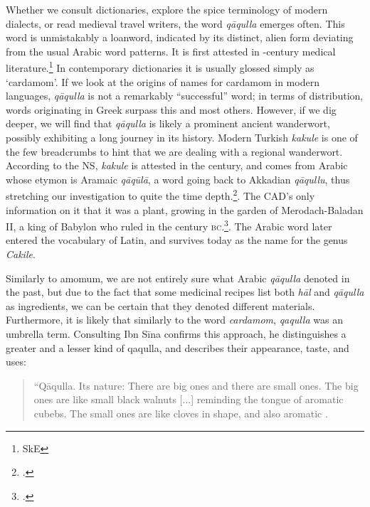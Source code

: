 

Whether we consult dictionaries, explore the spice terminology of modern dialects, or read medieval travel writers, the word  \textit{qāqulla} emerges often. This word is unmistakably a loanword, indicated by its distinct, alien form deviating from the usual Arabic word patterns. It is first attested in -century medical literature.\footnote{SkE} In contemporary dictionaries it is usually glossed simply as `cardamom'. If we look at the origins of names for cardamom in modern languages, \textit{qāqulla} is not a remarkably ``successful'' word; in terms of distribution, words originating in Greek surpass this and most others. However, if we dig deeper, we will find that \textit{qāqulla} is likely a prominent ancient \gls{wanderwort}, possibly exhibiting a long journey in its history. Modern Turkish \textit{kakule} is one of the few breadcrumbs to hint that we are dealing with a regional \gls{wanderwort}. According to the \gls{NS}, \textit{kakule} is attested in the  century, and comes from Arabic whose etymon is Aramaic \textit{qāqūlā}, a word going back to Akkadian \textit{qāqullu}, thus stretching our investigation to quite the time depth.\footcite[kakule ]{ns}. The \gls{CAD}'s only information on it that it was a plant, growing in the garden of Merodach-Baladan II, a king of Babylon who ruled in the  century \textsc{bc}.\footcite[Vol. 13, p. 124]{roth_assyrian_2004}. The Arabic word later entered the vocabulary of Latin, and survives today as the name for the genus \textit{Cakile}.

Similarly to amomum, we are not entirely sure what Arabic \textit{qāqulla} denoted in the past, but due to the fact that some medicinal recipes list both \textit{hāl} and \textit{qāqulla} as ingredients, we can be certain that they denoted different materials. Furthermore, it is likely that similarly to the word \textit{cardamom}, \textit{qaqulla} was an umbrella term. Consulting Ibn S\={i}na confirms this approach, he distinguishes a greater and a lesser kind of qaqulla, and describes their appearance, taste, and uses:

\begin{quote}
{\small``Q\={a}qulla. Its nature: There are big ones and there are small ones. The big ones are like small black walnuts [...] reminding the tongue of aromatic cubebs. The small ones are like cloves in shape, and also aromatic \autocite{ibn_sina_-qanun_1329}.}
\end{quote}

